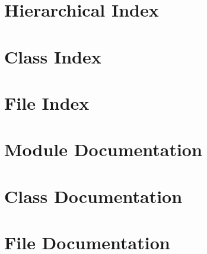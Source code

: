 \documentclass[twoside]{book}
\newcommand{\+}{\discretionary{\mbox{\scriptsize$\hookleftarrow$}}{}{}}
\newcommand{\clearemptydoublepage}{%
  \newpage{\pagestyle{empty}\cleardoublepage}%
}
\begin{document}
\chapter{Hierarchical Index}

\chapter{Class Index}

\chapter{File Index}

\chapter{Module Documentation}

\chapter{Class Documentation}













\chapter{File Documentation}



























\backmatter
\newpage
{}
\clearemptydoublepage
{}
\printindex
\end{document}
